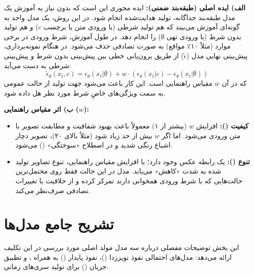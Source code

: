 \begin{solutionbox}
    \textbf{الف) ایده اصلی (طبقه‌بند ضمنی):}
    ایده محوری  این است که بدون نیاز به آموزش یک مدل طبقه‌بند جداگانه، تولید هدایت‌شده انجام شود. در این روش، یک مدل واحد به گونه‌ای آموزش می‌بیند که هم تولید شرطی (با ورودی متن یا برچسب $c$) و هم تولید بدون شرط (با ورودی تهی $\emptyset$) را انجام دهد. در طول آموزش، شرط ورودی در برخی موارد (مثلاً ۱۰٪ مواقع) به صورت تصادفی حذف می‌شود.
    در هنگام نمونه‌برداری، پیش‌بینی نهایی مدل ($\tilde{\epsilon}$) از طریق برون‌یابی خطی بین پیش‌بینی بدون شرط و پیش‌بینی شرطی به دست می‌آید:
    \[ \tilde{\epsilon}_\theta(x_t, c) = \epsilon_\theta(x_t|\emptyset) + w \cdot (\epsilon_\theta(x_t|c) - \epsilon_\theta(x_t|\emptyset)) \]
    که در آن $w$ مقیاس راهنمایی است. این کار باعث می‌شود جهت تولید از حالت عمومی به سمت ویژگی‌های خاصِ شرط مورد نظر هل داده شود.

    

    \textbf{ب) اثر مقیاس راهنمایی ($w$):}
    \begin{itemize}
        \item \textbf{کیفیت ():} افزایش $w$ (بیشتر از ۱) معمولاً باعث بهبود شفافیت و مطابقت تصویر با متن ورودی می‌شود. اما اگر $w$ بیش از حد زیاد شود (مثلاً بالای ۲۰)، تصویر دچار اشباع رنگی شدید و در اصطلاح «سوختگی» () می‌شود.
        \item \textbf{تنوع ():} یک رابطه عکس وجود دارد؛ با افزایش مقیاس راهنمایی، تنوع تصاویر تولید شده به شدت «کاهش» می‌یابد. مدل در این حالت فقط روی محتمل‌ترین حالت‌هایی که با شرط ورودی همخوانی دارند تمرکز کرده و از خلاقیت یا تغییرات تصادفی صرف‌نظر می‌کند.
    \end{itemize}
\end{solutionbox}



\section{تشریح جامع مدل‌ها}
این بخش توضیحات مفصلی درباره سه مدل مولد اصلی مورد بررسی در این تکلیف ارائه می‌دهد: مدل‌های احتمالی نفوذ نویززدا ()، نفوذ پایدار () به همراه ، و تطبیق جریان () برای تولید سری‌های زمانی.

